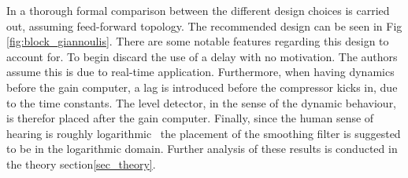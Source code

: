 \documentclass[../main2.tex]{subfiles}
\begin{document}
In \cite{reiss2012tutorial} a thorough formal comparison between the different design choices is carried out, assuming feed-forward topology. The recommended design can be seen in Fig \ref{fig:block_giannoulis}. There are some notable features regarding this design to account for. To begin \cite{reiss2012tutorial} discard the use of a delay with no motivation. The authors assume this is due to real-time application. Furthermore, when having dynamics before the gain computer, a lag is introduced before the compressor kicks in, due to the time constants. The level detector, in the sense of the dynamic behaviour, is therefor placed after the gain computer. Finally, since the human sense of hearing is roughly logarithmic~\cite{fastl2007psychoacoustics} the placement of the smoothing filter is suggested to be in the logarithmic domain. Further analysis of these results is conducted in the theory section\ref{sec_theory}.
 
\end{document}
